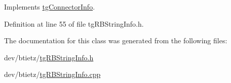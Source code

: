 Implements \hyperlink{classtg_connector_info}{tg\-Connector\-Info}.



Definition at line 55 of file tg\-R\-B\-String\-Info.\-h.



The documentation for this class was generated from the following files\-:\begin{DoxyCompactItemize}
\item 
dev/btietz/\hyperlink{tg_r_b_string_info_8h}{tg\-R\-B\-String\-Info.\-h}\item 
dev/btietz/\hyperlink{tg_r_b_string_info_8cpp}{tg\-R\-B\-String\-Info.\-cpp}\end{DoxyCompactItemize}
